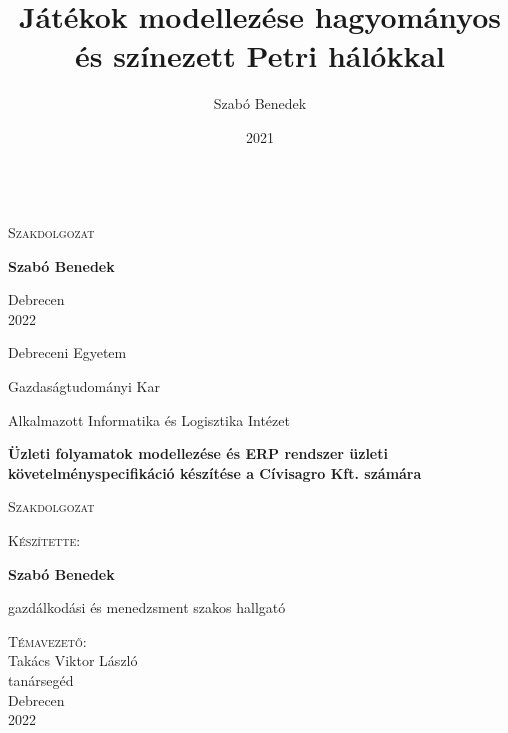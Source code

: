 \documentclass[12pt]{article}
\title{Játékok modellezése hagyományos és színezett Petri hálókkal}
\author{Szabó Benedek}
\date{2021}
\begin{document}
\begin{titlepage}

	\begin{center}
	\mbox{}\\
	\vspace{35mm}
	\huge
	\textsc{Szakdolgozat}
	\end{center}

	
	\vspace{55mm}
	\Large
	\hspace*{\fill} 
	\textbf{Szabó Benedek}
	
	\begin{center}
	\vspace{55mm}
	Debrecen\\	
	2022
	
	\end{center}
\end{titlepage}
\begin{titlepage}

	\vspace*{-2cm}
	\hspace*{-1.5cm}

	\begin{center}
	\large
	Debreceni Egyetem
	
	Gazdaságtudományi Kar	

	Alkalmazott Informatika és Logisztika Intézet
	
	\vspace{17mm}
	\huge
	\LARGE
    \textbf{Üzleti folyamatok modellezése és ERP rendszer üzleti követelményspecifikáció készítése a Cívisagro Kft. számára}
	
	\vspace{9mm}
	\large
	\textsc{Szakdolgozat}
	
	\normalsize
	\vspace{15mm}
	\textsc{Készítette:}
	
	\vspace{5mm}
	\Large
	\textbf{Szabó Benedek}
	
	\normalsize
	gazdálkodási és menedzsment szakos hallgató
	
	\vspace{18mm}
	\textsc{Témavezető:}\\
	\vspace{5mm}
	\large
	Takács Viktor László \\
	\normalsize
	tanársegéd\\
	
	\vspace{27mm}
	Debrecen\\	
	2022
	
	\end{center}
\end{titlepage}
\newpage
\tableofcontents
\newpage
\end{document}
